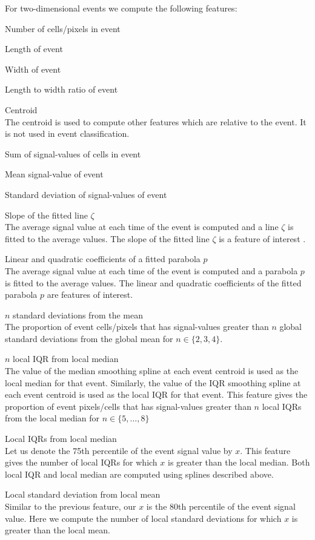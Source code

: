 \documentclass[a4paper,11pt]{article}
\begin{document}
For two-dimensional events we compute the following features:
\begin{compactenum}
	\item Number of cells/pixels in event
	\item Length of event
	\item Width of event
	\item Length to width ratio of event
	\item Centroid \\
	The centroid is used to compute other features which are relative to the event. It is not used in event classification.
	\item Sum of signal-values of cells in event
	\item Mean signal-value of event
	\item Standard deviation of signal-values of event
	\item Slope of the fitted line $\zeta$ \\
	The average signal value at each time of the event is computed and a line $\zeta$ is fitted to the average values. The slope of the fitted line $\zeta$ is a feature of interest .
	\item Linear and quadratic coefficients of a fitted parabola $p$ \\
	The average signal value at each time of the event is computed and a parabola $p$ is fitted to the average values. The linear and quadratic coefficients of the fitted parabola $p$ are features of interest.
	\item $n$ standard deviations from the mean \\
	The proportion of event cells/pixels that has signal-values greater than $n$ global standard deviations from the global mean for $n \in \{2, 3, 4\}$.
	\item $n$ local IQR from local median \\
	The value of the median smoothing spline at each event centroid is used as the local median for that event. Similarly, the value of the IQR smoothing spline at each event centroid is used as the local IQR for that event. This feature gives the proportion of event pixels/cells that has signal-values greater than $n$ local IQRs from the local median for $n \in \{ 5, \dots, 8 \} $
	\item Local IQRs from local median \\
	Let us denote the 75th percentile of the event signal value by $x$. This feature gives the number of local IQRs for which $x$ is greater than the local median. Both local IQR and local median are computed using splines described above.
	\item Local standard deviation from local mean \\
	Similar to the previous feature, our $x$ is the 80th percentile of the event signal value. Here we compute the number of local standard deviations for which $x$ is greater than the local mean.
\end{compactenum}
\end{document}
